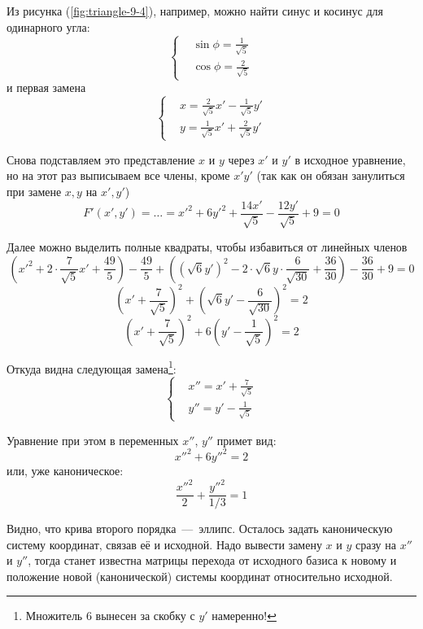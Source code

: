 \documentclass[a4paper,12pt]{article}
\begin{document}
\begin{solution}
    Из рисунка (\ref{fig:triangle-9-4}), например, можно найти синус и косинус для одинарного угла:
    \[
      \left\{
        \begin{aligned}
          &\sin\phi = \frac{1}{\sqrt{5}}\\
          &\cos\phi = \frac{2}{\sqrt{5}}
        \end{aligned}
      \right.
    \]
    и первая замена
    \[
      \boxed{
        \left\{
          \begin{aligned}
            &x = \frac{2}{\sqrt{5}} x' - \frac{1}{\sqrt{5}} y'\\
            &y = \frac{1}{\sqrt{5}} x' + \frac{2}{\sqrt{5}} y'
          \end{aligned}
        \right.
      }
    \]
    
    Снова подставляем это представление $x$ и $y$ через $x'$ и $y'$ в исходное уравнение, но на этот раз выписываем все члены, кроме $x'y'$ (так как он обязан занулиться при замене $x, y$ на $x', y'$)
    \[
      F'(x', y') = \ldots = x'^2 + 6y'^2 + \frac{14x'}{\sqrt{5}} - \frac{12y'}{\sqrt{5}} + 9 = 0
    \]
    
    Далее можно выделить полные квадраты, чтобы избавиться от линейных членов
    \[
      \left(x'^2 + 2 \cdot \frac{7}{\sqrt{5}} x' + \frac{49}{5}\right) - \frac{49}{5}
        + \left(\left(\sqrt{6} y'\right)^2 - 2 \cdot \sqrt{6} y \cdot \frac{6}{\sqrt{30}} + \frac{36}{30}\right) - \frac{36}{30} + 9 = 0
    \]
    \[
      \left(x' + \frac{7}{\sqrt{5}}\right)^2 + \left(\sqrt{6} y' - \frac{6}{\sqrt{30}}\right)^2  = 2
    \]
    \[
      \left(x' + \frac{7}{\sqrt{5}}\right)^2 + 6\left(y' - \frac{1}{\sqrt{5}}\right)^2  = 2
    \]
    
    Откуда видна следующая замена\footnote{Множитель $6$ вынесен за скобку с $y'$ намеренно!}:
    \[
      \boxed{
        \left\{
          \begin{aligned}
            &x'' = x' + \frac{7}{\sqrt{5}}\\
            &y'' = y' - \frac{1}{\sqrt{5}}
          \end{aligned}
        \right.
      }
    \]
    
    Уравнение при этом в переменных $x''$, $y''$ примет вид:
    \[
      x''^2 + 6y''^2 = 2
    \]
    или, уже каноническое:
    \[
      \frac{x''^2}{2} + \frac{y''^2}{1/3} = 1
    \]
    
    Видно, что крива второго порядка~---~эллипс.
    Осталось задать каноническую систему координат, связав её и исходной.
    Надо вывести замену $x$ и $y$ сразу на $x''$ и $y''$, тогда станет известна матрицы перехода от исходного базиса к новому и положение новой (канонической) системы координат относительно исходной.
    

\end{solution}
\end{document}
